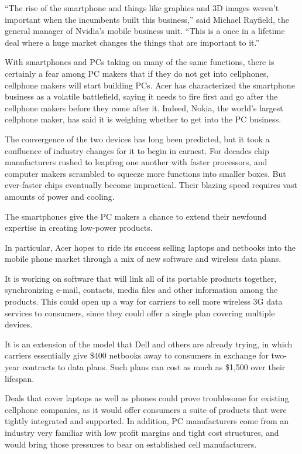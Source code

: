 \documentclass[12pt,a4paper,onecolumn]{article}
\begin{document}
\begin{CJK*}{GBK}{song}
``The rise of the smartphone and things like graphics and 3D images weren't important when the
incumbents built this business,'' said Michael Rayfield, the general manager of Nvidia's mobile
business unit. ``This is a once in a lifetime deal where a huge market changes the things that are
important to it.''

With smartphones and PCs taking on many of the same functions, there is certainly a fear among PC
makers that if they do not get into cellphones, cellphone makers will start building PCs. Acer has
characterized the smartphone business as a volatile battlefield, saying it needs to fire first and
go after the cellphone makers before they come after it. Indeed, Nokia, the world's largest
cellphone maker, has said it is weighing whether to get into the PC business.

The convergence of the two devices has long been predicted, but it took a confluence of industry
changes for it to begin in earnest. For decades chip manufacturers rushed to leapfrog one another
with faster processors, and computer makers scrambled to squeeze more functions into smaller boxes.
But ever-faster chips eventually become impractical. Their blazing speed requires vast amounts of
power and cooling.

The smartphones give the PC makers a chance to extend their newfound expertise in creating low-power
products.

In particular, Acer hopes to ride its success selling laptops and netbooks into the mobile phone
market through a mix of new software and wireless data plans.

It is working on software that will link all of its portable products together, synchronizing
e-mail, contacts, media files and other information among the products. This could open up a way for
carriers to sell more wireless 3G data services to consumers, since they could offer a single plan
covering multiple devices.

It is an extension of the model that Dell and others are already trying, in which carriers
essentially give \$400 netbooks away to consumers in exchange for two-year contracts to data plans.
Such plans can cost as much as \$1,500 over their lifespan.

Deals that cover laptops as well as phones could prove troublesome for existing cellphone companies,
as it would offer consumers a suite of products that were tightly integrated and supported. In
addition, PC manufacturers come from an industry very familiar with low profit margins and tight
cost structures, and would bring those pressures to bear on established cell manufacturers.


\end{CJK*}
\end{document}
